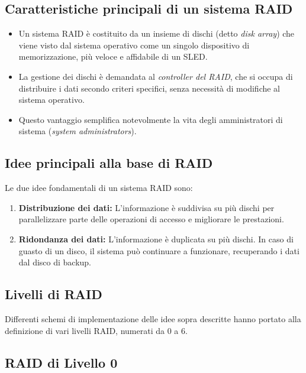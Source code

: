 \subsection{Caratteristiche principali di un sistema RAID}

\begin{itemize}
    \item Un sistema RAID è costituito da un insieme di dischi (detto \textit{disk array}) che viene visto dal sistema operativo come un singolo dispositivo di memorizzazione, più veloce e affidabile di un SLED.
    \item La gestione dei dischi è demandata al \textit{controller del RAID}, che si occupa di distribuire i dati secondo criteri specifici, senza necessità di modifiche al sistema operativo. 
    \item Questo vantaggio semplifica notevolmente la vita degli amministratori di sistema (\textit{system administrators}).
\end{itemize}

\subsection{Idee principali alla base di RAID}

Le due idee fondamentali di un sistema RAID sono:
\begin{enumerate}
    \item \textbf{Distribuzione dei dati:} L'informazione è suddivisa su più dischi per parallelizzare parte delle operazioni di accesso e migliorare le prestazioni.
    \item \textbf{Ridondanza dei dati:} L'informazione è duplicata su più dischi. In caso di guasto di un disco, il sistema può continuare a funzionare, recuperando i dati dal disco di backup.
\end{enumerate}

\subsection{Livelli di RAID}

Differenti schemi di implementazione delle idee sopra descritte hanno portato alla definizione di vari livelli RAID, numerati da 0 a 6. 
\subsection{RAID di Livello 0}

